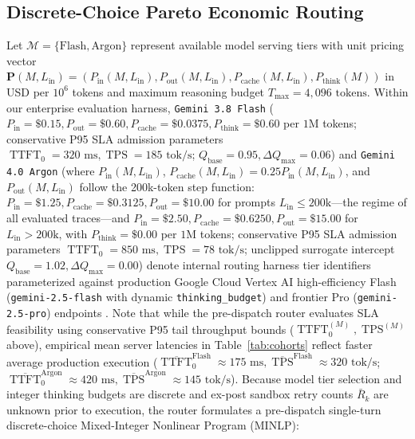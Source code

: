 \documentclass[conference,10pt]{IEEEtran}
\begin{document}
\subsection{Discrete-Choice Pareto Economic Routing}
Let $\mathcal{M} = \{\text{Flash}, \text{Argon}\}$ represent available model serving tiers with unit pricing vector $\mathbf{P}(M, L_{\text{in}}) = (P_{\text{in}}(M, L_{\text{in}}), P_{\text{out}}(M, L_{\text{in}}), P_{\text{cache}}(M, L_{\text{in}}), P_{\text{think}}(M))$ in USD per $10^6$ tokens and maximum reasoning budget $T_{\max} = 4{,}096\text{ tokens}$. Within our enterprise evaluation harness, \texttt{Gemini 3.8 Flash} ($P_{\text{in}}=\$0.15, P_{\text{out}}=\$0.60, P_{\text{cache}}=\$0.0375, P_{\text{think}}=\$0.60$ per $1\text{M}$ tokens; conservative P95 SLA admission parameters $\operatorname{TTFT}_0=320\text{ ms}, \operatorname{TPS}=185\text{ tok/s}$; $Q_{\text{base}}=0.95, \Delta Q_{\max}=0.06$) and \texttt{Gemini 4.0 Argon} (where $P_{\text{in}}(M, L_{\text{in}})$, $P_{\text{cache}}(M, L_{\text{in}}) = 0.25 P_{\text{in}}(M, L_{\text{in}})$, and $P_{\text{out}}(M, L_{\text{in}})$ follow the 200k-token step function: $P_{\text{in}}=\$1.25, P_{\text{cache}}=\$0.3125, P_{\text{out}}=\$10.00$ for prompts $L_{\text{in}} \le 200\text{k}$---the regime of all evaluated traces---and $P_{\text{in}}=\$2.50, P_{\text{cache}}=\$0.6250, P_{\text{out}}=\$15.00$ for $L_{\text{in}} > 200\text{k}$, with $P_{\text{think}}=\$0.00$ per $1\text{M}$ tokens; conservative P95 SLA admission parameters $\operatorname{TTFT}_0=850\text{ ms}, \operatorname{TPS}=78\text{ tok/s}$; unclipped surrogate intercept $Q_{\text{base}}=1.02, \Delta Q_{\max}=0.00$) denote internal routing harness tier identifiers parameterized against production Google Cloud Vertex AI high-efficiency Flash (\texttt{gemini-2.5-flash} with dynamic \texttt{thinking\_\allowbreak budget}) and frontier Pro (\texttt{gemini-2.5-pro}) endpoints \cite{gemini2024, gemini2025}. Note that while the pre-dispatch router evaluates SLA feasibility using conservative P95 tail throughput bounds ($\operatorname{TTFT}_0^{(M)}, \operatorname{TPS}^{(M)}$ above), empirical mean server latencies in Table~\ref{tab:cohorts} reflect faster average production execution ($\overline{\operatorname{TTFT}}_0^{\text{Flash}} \approx 175\text{ ms}, \overline{\operatorname{TPS}}^{\text{Flash}} \approx 320\text{ tok/s}$; $\overline{\operatorname{TTFT}}_0^{\text{Argon}} \approx 420\text{ ms}, \overline{\operatorname{TPS}}^{\text{Argon}} \approx 145\text{ tok/s}$). Because model tier selection and integer thinking budgets are discrete and ex-post sandbox retry counts $\bar{R}_k$ are unknown prior to execution, the router formulates a pre-dispatch single-turn discrete-choice Mixed-Integer Nonlinear Program (MINLP):
\end{document}
